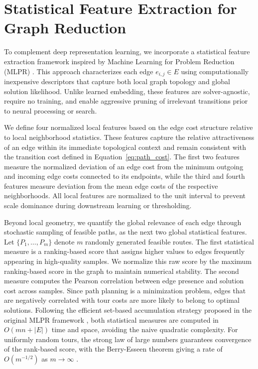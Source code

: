 \documentclass[twoside]{article}
\begin{document}
	

	\section{Statistical Feature Extraction for Graph Reduction}
	To complement deep representation learning, we incorporate a statistical feature extraction framework inspired by Machine Learning for Problem Reduction (MLPR) \cite{Sun:2021, Stodola:2025}. This approach characterizes each edge $e_{i,j} \in E$ using computationally inexpensive descriptors that capture both local graph topology and global solution likelihood. Unlike learned embedding, these features are solver-agnostic, require no training, and enable aggressive pruning of irrelevant transitions prior to neural processing or search.

	

	We define four normalized local features based on the edge cost structure relative to local neighborhood statistics. These features capture the relative attractiveness of an edge within its immediate topological context and remain consistent with the transition cost defined in Equation~\eqref{eq:path_cost}. The first two features measure the normalized deviation of an edge cost from the minimum outgoing and incoming edge costs connected to its endpoints, while the third and fourth features measure deviation from the mean edge costs of the respective neighborhoods. All local features are normalized to the unit interval to prevent scale dominance during downstream learning or thresholding. %

	

	Beyond local geometry, we quantify the global relevance of each edge through stochastic sampling of feasible paths, as the next two global statistical features. Let $\{P_1, \dots, P_m\}$ denote $m$ randomly generated feasible routes. The first statistical measure is a ranking-based score that assigns higher values to edges frequently appearing in high-quality samples. We normalize this raw score by the maximum ranking-based score in the graph to maintain numerical stability. The second measure computes the Pearson correlation between edge presence and solution cost across samples. Since path planning is a minimization problem, edges that are negatively correlated with tour costs are more likely to belong to optimal solutions. Following the efficient set-based accumulation strategy proposed in the original MLPR framework \cite{Sun:2021}, both statistical measures are computed in $O(mn + |E|)$ time and space, avoiding the naive quadratic complexity.
	For uniformly random tours, the strong law of large numbers guarantees convergence of the rank-based score, with the Berry-Esseen theorem giving a rate of $O(m^{-1/2})$ as $m\rightarrow \infty$ \cite{Berry1941, Korolev2010}. %
\end{document}
